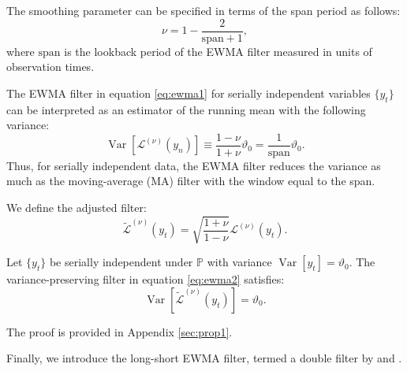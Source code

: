 \documentclass[hidelinks]{siamonline250211}
\DeclareMathOperator{\Var}{Var}
\newcommand{\spn}{\mathrm{span}}
\begin{document}
The smoothing parameter can be specified in terms of the span period as follows:
\begin{equation} \label{eq:i2} 
	\nu =1 - \frac{2}{\spn+1},
\end{equation}
where $\spn$ is the lookback period of the EWMA filter measured in units of observation times.


The EWMA filter in equation \eqref{eq:ewma1} for serially independent variables $\{y_{t}\}$ can be interpreted as an estimator of the running mean with the following variance:
\begin{equation} \label{eq:v7} 
	\Var\left[ \mathcal{L}^{(\nu)} (y_{n}) \right]  \equiv   \frac{ 1-\nu   }{ 1+\nu} \vartheta_{0} =  \frac{ 1}{ \spn } \vartheta_{0}.
\end{equation}
Thus, for serially independent data, the EWMA filter reduces the variance as much as the moving-average (MA) filter with the window equal to the span.


\begin{definition} We define the adjusted filter:
	\begin{equation} \label{eq:ewma2} 
		\tilde{\mathcal{L}}^{(\nu)} (y_{t})   = \sqrt{ \frac{ 1+\nu}{ 1-\nu} } \mathcal{L}^{(\nu)} (y_{t}). 
	\end{equation}
\end{definition}

\begin{proposition}\label{prop1} Let $\{y_{t}\}$ be serially independent under $\mathbb{P}$ with variance $\Var[y_{t}]=\vartheta_{0}$. The variance-preserving filter in equation \eqref{eq:ewma2} satisfies:
	\begin{equation} \label{eq:ewma2a} 
		\Var[\widetilde{\mathcal{L}}^{(\nu)} (y_{t})]   = \vartheta_0.
	\end{equation}
\end{proposition}
The proof is provided in Appendix \ref{sec:prop1}.



Finally, we introduce the long-short EWMA filter, termed a double filter by \citet{Martin2012} and \citet{Martin2023}.
\end{document}
